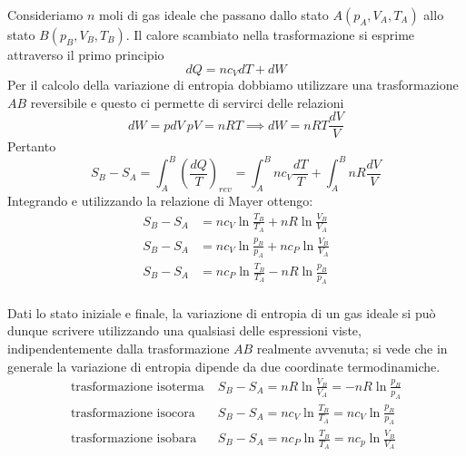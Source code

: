\documentclass[class=book, crop=false, oneside, 12pt]{standalone}
\begin{document}
Consideriamo \(n\) moli di gas ideale che passano dallo stato \(A ( p_A , V_A, T_A)\) allo stato \(B ( p_B , V_B, T_B)\). 
Il calore scambiato nella trasformazione si esprime attraverso il primo principio
\begin{equation*}
    d Q = n c_V d T + d W
\end{equation*}
Per il calcolo della variazione di entropia dobbiamo utilizzare una trasformazione \(A B\) reversibile e questo ci permette di servirci delle relazioni
\begin{equation*}
    dW=pdV  \ pV=nRT \implies dW=nRT \frac{dV}{V}
\end{equation*}
Pertanto
\begin{equation}
    S_B - S_A = \int_A^B \left(\frac{d Q}{T}\right)_{rev} = \int_A^B n c_V \frac{d T}{T} + \int_A^B n R \frac{d V}{V}
\end{equation}
Integrando e utilizzando la relazione di Mayer ottengo:
\begin{align*}
    S_B - S_A &= n c_V \ln \frac{T_B}{T_A} + n R \ln \frac{V_B}{V_A}\\
    S_B - S_A &= n c_V \ln \frac{p_B}{p_A} + n c_P \ln \frac{V_B}{V_A}\\
    S_B - S_A &= n c_P \ln \frac{T_B}{T_A} - n R \ln \frac{p_B}{p_A}\\
\end{align*}

Dati lo stato iniziale e finale, la variazione di entropia di un gas ideale si può dunque scrivere utilizzando una qualsiasi delle espressioni viste, indipendentemente dalla trasformazione \(A B\) realmente avvenuta; si vede che in generale la variazione di entropia dipende da due coordinate termodinamiche.
\begin{align*}
    \text{trasformazione isoterma} \; &S_B - S_A = n R \ln \frac{V_B}{V_A} = - n R \ln \frac{p_B}{p_A} \\
    \text{trasformazione isocora} \; &S_B - S_A = n c_V \ln \frac{T_B}{T_A} = n c_V \ln \frac{p_B}{p_A}\\
    \text{trasformazione isobara} \; &S_B - S_A = n c_P \ln \frac{T_B}{T_A} = n c_p \ln \frac{V_B}{V_A}\\
\end{align*}
\end{document}
